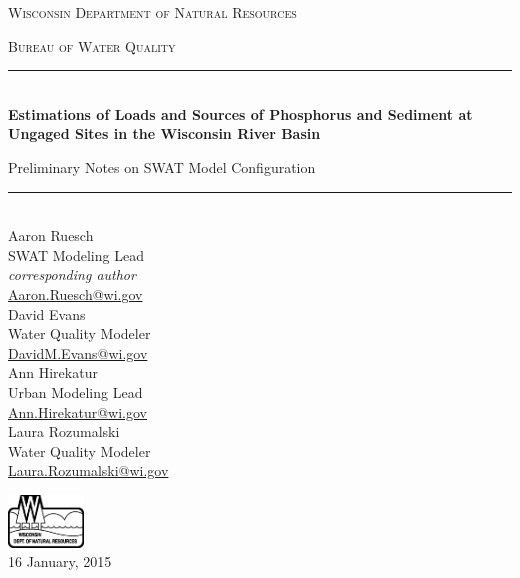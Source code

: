 \begin{titlepage}
\begin{center}
	\bigskip
	\textsc{ \Large  Wisconsin Department of Natural Resources}\par
	\medskip
	\textsc{ \Large Bureau of Water Quality}\par
	\bigskip
	\rule{\linewidth}{0.5mm} \\[0.4cm]
	\textbf{\Large Estimations of Loads and Sources of Phosphorus and Sediment at Ungaged Sites in the Wisconsin River Basin}\par
	\medskip
	{\Large Preliminary Notes on SWAT Model Configuration}\par
	\rule{\linewidth}{0.5mm} \\[0.4cm]
	\bigskip
	\noindent
	Aaron Ruesch \\
	SWAT Modeling Lead \\
	\textit{corresponding author} \\
	\href{mailto:Aaron.Ruesch@wi.gov}{Aaron.Ruesch@wi.gov} \\
	\medskip
	David Evans \\
	Water Quality Modeler \\
	\href{mailto:DavidM.Evans@wi.gov}{DavidM.Evans@wi.gov} \\
	\medskip
	Ann Hirekatur \\
	Urban Modeling Lead \\
	\href{mailto:Ann.Hirekatur@wi.gov}{Ann.Hirekatur@wi.gov} \\
	\medskip
	Laura Rozumalski \\
	Water Quality Modeler \\
	\href{mailto:Laura.Rozumalski@wi.gov}{Laura.Rozumalski@wi.gov} \\

	\vfill
	
	\includegraphics[width=0.15\textwidth]{./img/DNR2.eps} \\
	\medskip
	{\large 16 January, 2015}
	
\end{center}
\end{titlepage}
